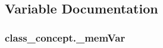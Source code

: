 \subsection{Variable Documentation}
\hypertarget{namespaceclass__concept_a2484b326177de7a6ccebf55ac418e313}{
\subsubsection[{\-\_\-mem\-Var}]{\setlength{\rightskip}{0pt plus 5cm}class\-\_\-concept.\-\_\-mem\-Var}}\label{namespaceclass__concept_a2484b326177de7a6ccebf55ac418e313}
